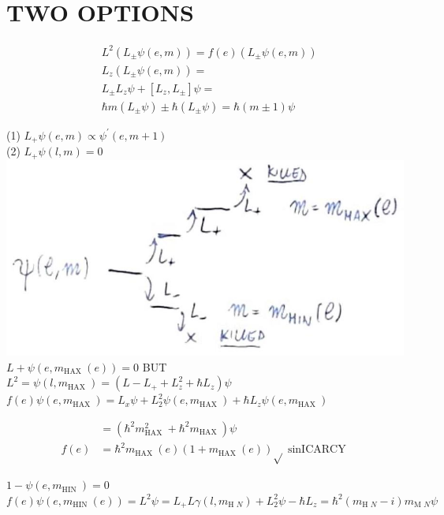 \documentclass[10pt]{article}
\begin{document}
\section*{TWO OPTIONS}
$$
\begin{aligned}
& L^{2}\left(L_{ \pm} \psi(e, m)\right)=f(e)\left(L_{ \pm} \psi(e, m)\right) \\
& L_{z}\left(L_{ \pm} \psi(e, m)\right)= \\
& L_{ \pm} L_{z} \psi+\left[L_{z}, L_{ \pm}\right] \psi= \\
& \hbar m\left(L_{ \pm} \psi\right) \pm \hbar\left(L_{ \pm} \psi\right)=\hbar(m \pm 1) \psi
\end{aligned}
$$

(1) $L_{+} \psi(e, m) \propto \psi^{\prime}(e, m+1)$\\
(2) $L_{+} \psi(l, m)=0$\\
\includegraphics[max width=\textwidth, center]{2025_10_16_22329e0f50bdd2511b17g-04}\\
$L+\psi\left(e, m_{\text {HAX }}(e)\right)=0$ BUT\\
$L^{2}=\psi\left(l, m_{\text {HAX }}\right)=\left(L-L_{+}+L_{z}^{2}+\hbar L_{z}\right) \psi$\\
$f(e) \psi\left(e, m_{\text {HAX }}\right)=L_{x} \psi+L_{2}^{2} \psi\left(e, m_{\text {HAX }}\right)+\hbar L_{z} \psi\left(e, m_{\text {HAX }}\right)$

$$
\begin{aligned}
& =\left(\hbar^{2} m_{\text {HAX }}^{2}+\hbar^{2} m_{\text {HAX }}\right) \psi \\
f(e) & =\hbar^{2} m_{\text {HAX }}(e)\left(1+m_{\text {HAX }}(e)\right) \sqrt{ } \operatorname{sinICARCY}
\end{aligned}
$$

$1-\psi\left(e, m_{\text {HIN }}\right)=0$\\
$f(e) \psi\left(e, m_{\text {HIN }}(e)\right)=L^{2} \psi=L_{+} L \gamma\left(l, m_{\text {H } N}\right)+L_{2}^{2} \psi-\hbar L_{z}=\hbar^{2}\left(m_{\text {H } N}-i\right) m_{\text {M } N} \psi$
\end{document}
